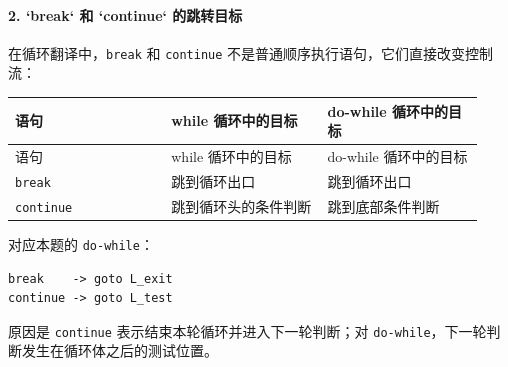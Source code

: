 \documentclass[UTF8]{ctexart}
\begin{document}
\paragraph*{2. `break` 和 `continue` 的跳转目标}

在循环翻译中，\texttt{break} 和 \texttt{continue} 不是普通顺序执行语句，它们直接改变控制流：

\begin{longtable}{|p{0.31\linewidth}|p{0.31\linewidth}|p{0.31\linewidth}|}
\hline
语句 & while 循环中的目标 & do-while 循环中的目标 \\
\hline
\endfirsthead
语句 & while 循环中的目标 & do-while 循环中的目标 \\
\hline
\endhead
\texttt{break} & 跳到循环出口 & 跳到循环出口 \\
\hline
\texttt{continue} & 跳到循环头的条件判断 & 跳到底部条件判断 \\
\hline
\end{longtable}

对应本题的 \texttt{do-while}：

\begin{Verbatim}[fontsize=\small,breaklines=true]
break    -> goto L_exit
continue -> goto L_test
\end{Verbatim}

原因是 \texttt{continue} 表示结束本轮循环并进入下一轮判断；对 \texttt{do-while}，下一轮判断发生在循环体之后的测试位置。
\end{document}
